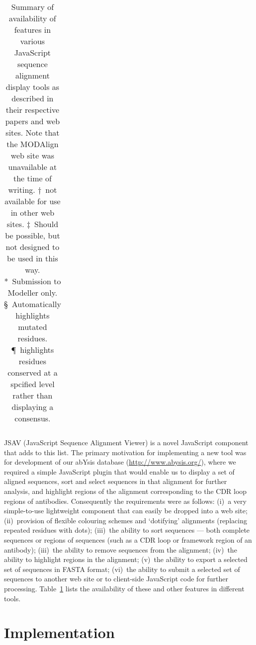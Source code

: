 \documentclass[a4]{article}
\begin{document}
\begin{table}
\begin{center}
\begin{tabularx}{\linewidth}{Xlllll}
\end{tabularx}
\end{center}
\caption{\label{tab:features}Summary of availability of features in
  various JavaScript sequence alignment display tools as described in
  their respective papers and web sites. Note that the MODAlign web
  site was unavailable at the time of writing. $\dag$~not available
  for use in other web sites. $\ddag$~Should be possible, but not
  designed to be used in this way. *~Submission to Modeller only. 
  \S~Automatically highlights mutated residues. \P~highlights residues
  conserved at a spcified level rather than displaying a consensus.}
\end{table}

JSAV (JavaScript Sequence Alignment Viewer) is a novel JavaScript
component that adds to this list. The primary motivation for
implementing a new tool was for development of our abYsis database
(\url{http://www.abysis.org/}), where we required a simple JavaScript
plugin that would enable us to display a set of aligned sequences,
sort and select sequences in that alignment for further analysis, and
highlight regions of the alignment corresponding to the CDR loop
regions of antibodies. Consequently the requirements were as follows:
(i)~a very simple-to-use lightweight component that can easily be
dropped into a web site; (ii)~provision of flexible colouring schemes
and `dotifying' alignments (replacing repeated residues with dots);
(iii)~the ability to sort sequences --- both complete sequences or
regions of sequences (such as a CDR loop or framework region of an
antibody); (iii)~the ability to remove sequences from the alignment;
(iv)~the ability to highlight regions in the alignment; (v)~the
ability to export a selected set of sequences in FASTA format;
(vi)~the ability to submit a selected set of sequences to another web
site or to client-side JavaScript code for further processing.
Table~\ref{tab:features} lists the availability of these and other
features in different tools.

\section{Implementation}
\end{document}
